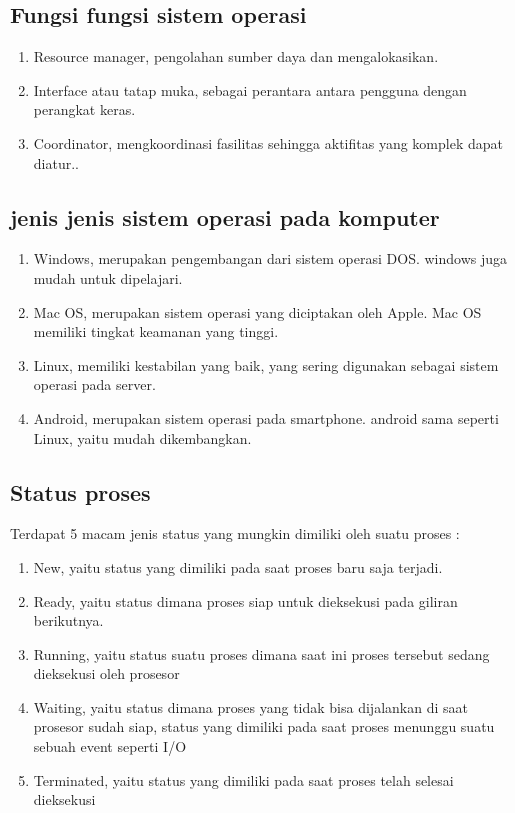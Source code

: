 	\subsection{Fungsi fungsi sistem operasi}
		\begin{enumerate}
			\item Resource manager, pengolahan sumber daya dan mengalokasikan.
			\item Interface atau tatap muka, sebagai perantara antara pengguna dengan perangkat keras.
			\item Coordinator, mengkoordinasi fasilitas sehingga aktifitas yang komplek dapat diatur..
		\end{enumerate}
		
		\subsection{jenis jenis sistem operasi pada komputer}
			\begin{enumerate}
				\item Windows, merupakan pengembangan dari sistem operasi DOS. windows juga mudah untuk dipelajari.
				\item Mac OS, merupakan sistem operasi yang diciptakan oleh Apple. Mac OS memiliki tingkat keamanan yang tinggi.
				\item Linux, memiliki kestabilan yang baik, yang sering digunakan sebagai sistem operasi pada server.
				\item Android, merupakan sistem operasi pada smartphone. android sama seperti Linux, yaitu mudah dikembangkan.
			\end{enumerate}
			
	\subsection{Status proses}
	Terdapat 5 macam jenis status yang mungkin dimiliki oleh suatu proses :
	\begin{enumerate}
		\item New, yaitu status yang dimiliki pada saat proses baru saja terjadi.
		\item Ready, yaitu status dimana proses siap untuk dieksekusi pada giliran berikutnya.
		\item Running, yaitu status suatu proses dimana saat ini proses tersebut sedang dieksekusi oleh prosesor
		\item Waiting, yaitu status dimana proses yang tidak bisa dijalankan di saat prosesor sudah siap, status yang dimiliki pada saat proses menunggu suatu sebuah event seperti I/O
		\item Terminated, yaitu status yang dimiliki pada saat proses telah selesai dieksekusi
	\end{enumerate}
	
